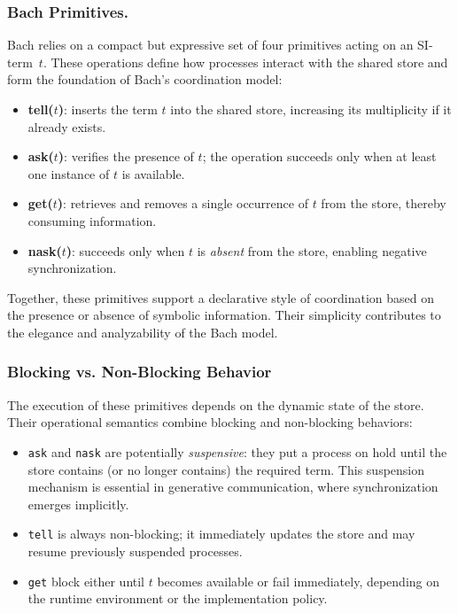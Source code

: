 \subsubsection{Bach Primitives.}
Bach relies on a compact but expressive set of four primitives acting on an SI-term~$t$.
These operations define how processes interact with the shared store and form the
foundation of Bach’s coordination model:

\begin{itemize}
    \item \textbf{tell($t$)}: inserts the term $t$ into the shared store, increasing its multiplicity if it already exists.
    \item \textbf{ask($t$)}: verifies the presence of $t$; the operation succeeds only when at least one instance of $t$ is available.
    \item \textbf{get($t$)}: retrieves and removes a single occurrence of $t$ from the store, thereby consuming information.
    \item \textbf{nask($t$)}: succeeds only when $t$ is \emph{absent} from the store, enabling negative synchronization.
\end{itemize}

Together, these primitives support a declarative style of coordination based on the
presence or absence of symbolic information. Their simplicity contributes to the
elegance and analyzability of the Bach model.

\subsubsection{Blocking vs. Non-Blocking Behavior}
The execution of these primitives depends on the dynamic state of the store.
Their operational semantics combine blocking and non-blocking behaviors:

\begin{itemize}
    \item \texttt{ask} and \texttt{nask} are potentially \emph{suspensive}:
    they put a process on hold until the store contains (or no longer contains)
    the required term. This suspension mechanism is essential in generative
    communication, where synchronization emerges implicitly.
    \item \texttt{tell} is always non-blocking; it immediately updates the store
    and may resume previously suspended processes.
    \item \texttt{get} block either until $t$ becomes available or fail immediately,
    depending on the runtime environment or the implementation policy.
\end{itemize}

